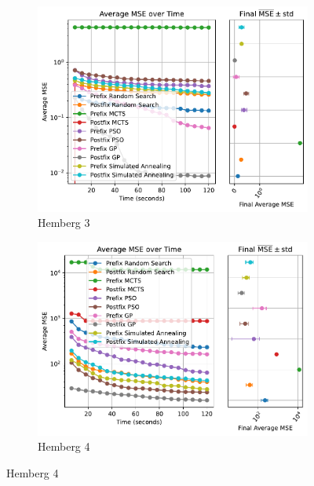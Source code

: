 \documentclass[runningheads]{llncs}
\begin{document}
\begin{figure}
    \begin{subfigure}[b]{0.4\textwidth}
        \includegraphics[width=\linewidth, keepaspectratio]{Hemberg_Benchmarks/Hemberg_Benchmark_3.pdf}
        \caption{Hemberg 3}
        \label{subfig:hemberg_3}
    \end{subfigure}
    \begin{subfigure}[b]{0.4\textwidth}
        \includegraphics[width=\linewidth, keepaspectratio]{Hemberg_Benchmarks/Hemberg_Benchmark_4.pdf}
        \caption{Hemberg 4}
        \label{subfig:hemberg_4}
    \end{subfigure}
    

\end{figure}
\end{document}
